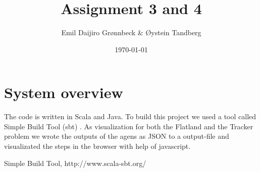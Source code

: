 \documentclass{article}
\begin{document}
\title{Assignment 3 and 4}
\author{Emil Daijiro Grønnbeck \& Øystein Tandberg}
\date{\today}
\maketitle

\section{System overview}
The code is written in Scala and Java. To build this project we used a tool called Simple Build Tool (sbt) \cite{sbt}. As visualization for both the Flatland and the Tracker problem we wrote the outputs of the agens as JSON to a output-file and visualizated the steps in the browser with help of javascript. 


\newpage



\begin{thebibliography}{9}

  Simple Build Tool, http://www.scala-sbt.org/

\end{thebibliography}
\end{document}
